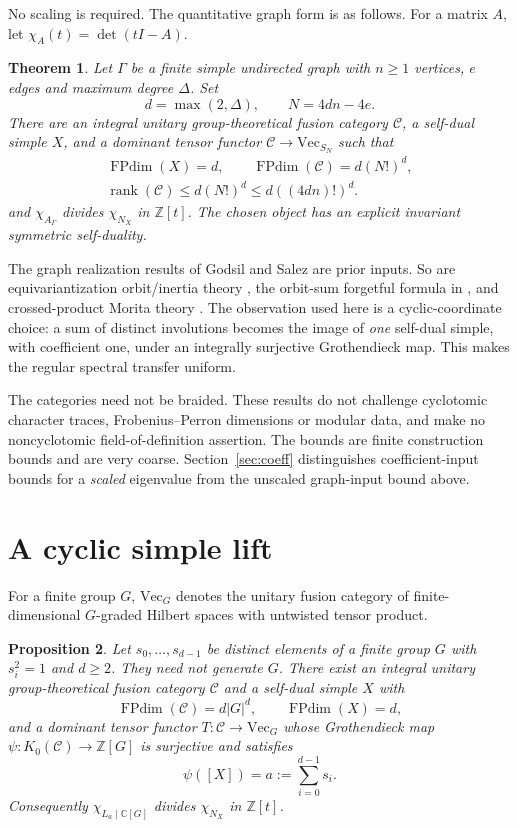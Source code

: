 \documentclass[11pt]{amsart}
\newtheorem{theorem}{Theorem}[section]
\newtheorem{proposition}[theorem]{Proposition}
\theoremstyle{remark}
\newcommand{\VEC}{\mathrm{Vec}}
\newcommand{\FPdim}{\operatorname{FPdim}}
\newcommand{\rank}{\operatorname{rank}}
\newcommand{\Z}{\mathbb Z}
\newcommand{\C}{\mathbb C}
\newcommand{\ch}{\chi}
\begin{document}
No scaling is required. The quantitative graph form is as follows.
For a matrix $A$, let $\ch_A(t)=\det(tI-A)$.

\begin{theorem}\label{thm:graph}
Let $\Gamma$ be a finite simple undirected graph with $n\ge1$ vertices,
$e$ edges and maximum degree $\Delta$. Set
\[
 d=\max(2,\Delta),\qquad N=4dn-4e.
\]
There are an integral unitary group-theoretical fusion category
$\mathcal C$, a self-dual simple $X$, and a dominant tensor functor
$\mathcal C\to\VEC_{S_N}$ such that
\[
 \begin{gathered}
 \FPdim(X)=d,\qquad \FPdim(\mathcal C)=d(N!)^d,\\
 \rank(\mathcal C)\le d(N!)^d\le d((4dn)!)^d.
 \end{gathered}
\]
and $\ch_{A_\Gamma}$ divides $\ch_{N_X}$ in $\Z[t]$.
The chosen object has an explicit invariant symmetric self-duality.
\end{theorem}

The graph realization results of Godsil \cite{Godsil} and Salez
\cite{Salez} are prior inputs. So are equivariantization orbit/inertia
theory \cite{BN}, the orbit-sum forgetful formula in
\cite[proof of Theorem 4.8]{Witherspoon}, and crossed-product Morita
theory \cite[Example 7.5 and Remark 7.6]{MN}. The observation used here
is a cyclic-coordinate choice: a sum of distinct involutions becomes
the image of \emph{one} self-dual simple, with coefficient one, under an
integrally surjective Grothendieck map. This makes the regular spectral
transfer uniform.

The categories need not be braided. These results do not challenge
cyclotomic character traces, Frobenius--Perron dimensions or modular data,
and make no noncyclotomic field-of-definition assertion.
The bounds are finite construction bounds and are very coarse.
Section~\ref{sec:coeff} distinguishes coefficient-input bounds for a
\emph{scaled} eigenvalue from the unscaled graph-input bound above.

\section{A cyclic simple lift}

For a finite group $G$, $\VEC_G$ denotes the unitary fusion category of
finite-dimensional $G$-graded Hilbert spaces with untwisted tensor product.

\begin{proposition}\label{prop:lift}
Let $s_0,\ldots,s_{d-1}$ be distinct elements of a finite group $G$ with
$s_i^2=1$ and $d\ge2$. They need not generate $G$. There exist an integral
unitary group-theoretical fusion category $\mathcal C$ and a self-dual
simple $X$ with
\[
 \FPdim(\mathcal C)=d|G|^d,\qquad \FPdim(X)=d,
\]
and a dominant tensor functor $T:\mathcal C\to\VEC_G$ whose Grothendieck
map $\psi:K_0(\mathcal C)\to\Z[G]$ is surjective and satisfies
\[
 \psi([X])=a:=\sum_{i=0}^{d-1}s_i.
\]
Consequently $\ch_{L_a\mid\C[G]}$ divides $\ch_{N_X}$ in $\Z[t]$.
\end{proposition}
\end{document}
